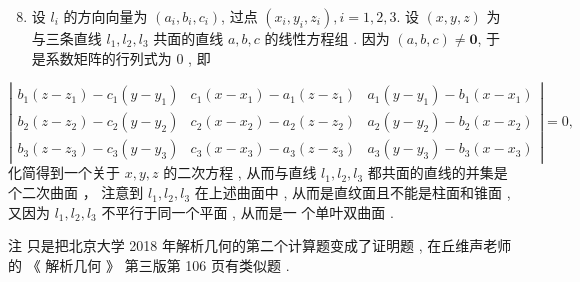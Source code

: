 \documentclass[10pt]{article}
\begin{document}
\begin{enumerate}
  \setcounter{enumi}{7}
  \item  设  $l_{i}$  的方向向量为  $\left(a_{i}, b_{i}, c_{i}\right)$,  过点  $\left(x_{i}, y_{i}, z_{i}\right), i=1,2,3$.  设  $(x, y, z)$  为与三条直线  $l_{1}, l_{2}, l_{3}$  共面的直线  $a, b, c$  的线性方程组 .  因为  $(a, b, c) \neq \mathbf{0}$,  于是系数矩阵的行列式为  0 ,  即 
\end{enumerate}
$$
\left|\begin{array}{lll}
b_{1}\left(z-z_{1}\right)-c_{1}\left(y-y_{1}\right) & c_{1}\left(x-x_{1}\right)-a_{1}\left(z-z_{1}\right) & a_{1}\left(y-y_{1}\right)-b_{1}\left(x-x_{1}\right) \\
b_{2}\left(z-z_{2}\right)-c_{2}\left(y-y_{2}\right) & c_{2}\left(x-x_{2}\right)-a_{2}\left(z-z_{2}\right) & a_{2}\left(y-y_{2}\right)-b_{2}\left(x-x_{2}\right) \\
b_{3}\left(z-z_{3}\right)-c_{3}\left(y-y_{3}\right) & c_{3}\left(x-x_{3}\right)-a_{3}\left(z-z_{3}\right) & a_{3}\left(y-y_{3}\right)-b_{3}\left(x-x_{3}\right)
\end{array}\right|=0,
$$
 化简得到一个关于  $x, y, z$  的二次方程 ,  从而与直线  $l_{1}, l_{2}, l_{3}$  都共面的直线的并集是个二次曲面 ， 注意到  $l_{1}, l_{2}, l_{3}$  在上述曲面中 ,  从而是直纹面且不能是柱面和锥面 ,  又因为  $l_{1}, l_{2}, l_{3}$  不平行于同一个平面 ,  从而是一   个单叶双曲面 .

 注   只是把北京大学  2018  年解析几何的第二个计算题变成了证明题 ,  在丘维声老师的 《 解析几何 》 第三版第  106  页有类似题 .
\end{document}
